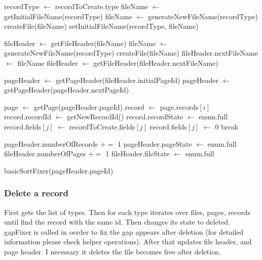 \documentclass{article}
\begin{document}
\begin{algorithm}[H]
    {
        recordType $\gets$ recordToCreate.type\;
        fileName $\gets$ getInitialFileName(recordType)\;
        {
            fileName $\gets$ generateNewFileName(recordType)\;
            createFile(fileName)\;
            setInitialFileName(recordType, fileName)\;
        }
        
        fileHeader $\gets$ getFileHeader(fileName)\;
        {
            {
                fileName $\gets$ generateNewFileName(recordType)\;
                createFile(fileName)\;
                fileHeader.nextFileName $\gets$ fileName\;
            }
            fileHeader $\gets$ getFileHeader(fileHeader.nextFileName)\;
        }
        
        pageHeader $\gets$ getPageHeader(fileHeader.initialPageId)\;
        {
            pageHeader $\gets$ getPageHeader(pageHeader.nextPageId)\;
        }
        
        page $\gets$ getPage(pageHeader.pageId)\;
        {
            {
                record $\gets$ page.records$[i]$\;
                record.recordId $\gets$ getNewRecordId()\;
                record.recordState $\gets$ enum.full\;
                {
                    {
                        record.fields$[j]$ $\gets$ recordToCreate.fields$[j]$\;
                    }
                    {
                        record.fields$[j]$ $\gets$ 0\;
                    }
                }
                break
            }
        }
        
        pageHeader.numberOfRecords $+=$ 1 \;
        {
            pageHeader.pageState $\gets$ enum.full\;
            fileHeader.numberOfPages $+=$ 1\;
            {
                fileHeader.fileState $\gets$ enum.full\;
            }
        }
        
        basicSortFixer(pageHeader.pageId)\;
    }
\end{algorithm}

\subsubsection{Delete a record}
First gets the list of types. Then for each type iterates over files, pages, records until find the record with the same id. Then changes its state to deleted. gapFixer is called in oerder to fix the gap appears after deletion (for detailed information please check helper operations). After that updates file header, and page header. I necessary it deletes the file becomes free after deletion.
\end{document}
